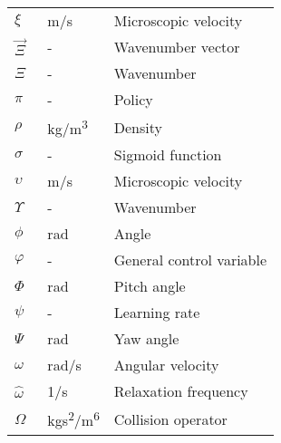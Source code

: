 \begin{longtable}{p{5cm}p{4cm}p{5cm}}
    $\xi$    		    & \SI{}{m/s}        & Microscopic velocity \\
   	$\vec{\Xi}$			& \SI{}{-}			& Wavenumber vector\\
 	$\Xi$				& \SI{}{-}			& Wavenumber\\
    $\pi$				& \SI{}{-}			& Policy \\
    $\rho$              & \SI{}{kg/m^3}     & Density \\
    $\sigma$			& \SI{}{-}			& Sigmoid function \\
    $\upsilon$			& \SI{}{m/s}		& Microscopic velocity \\
    $\Upsilon$			& \SI{}{-}			& Wavenumber \\
    $\phi$				& \SI{}{rad}		& Angle \\
    $\varphi$			& \SI{}{-}			& General control variable\\
    $\Phi$				& \SI{}{rad}		& Pitch angle \\
    $\psi$				& \SI{}{-}			& Learning rate \\
    $\Psi$				& \SI{}{rad}		& Yaw angle \\
    $\omega$			& \SI{}{rad/s}		& Angular velocity \\
    $\hat{\omega}$		& \SI{}{1/s}		& Relaxation frequency \\
    $\Omega$            & \SI{}{kgs^2/m^6}  & Collision operator \\
\end{longtable}

